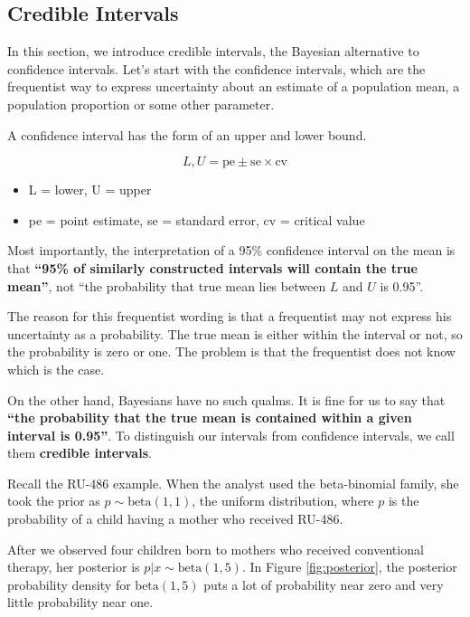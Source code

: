 \documentclass[]{book}
\providecommand{\tightlist}{%
  \setlength{\itemsep}{0pt}\setlength{\parskip}{0pt}}
\theoremstyle{definition}
\theoremstyle{definition}
\theoremstyle{definition}
\theoremstyle{remark}
\begin{document}
\subsection{Credible Intervals}\label{credible-intervals}

In this section, we introduce credible intervals, the Bayesian
alternative to confidence intervals. Let's start with the confidence
intervals, which are the frequentist way to express uncertainty about an
estimate of a population mean, a population proportion or some other
parameter.

A confidence interval has the form of an upper and lower bound.

\[L, U = \text{pe} \pm \text{se} \times \text{cv}\]

\begin{itemize}
\tightlist
\item
  L = lower, U = upper
\item
  pe = point estimate, se = standard error, cv = critical value
\end{itemize}

Most importantly, the interpretation of a 95\% confidence interval on
the mean is that \textbf{``95\% of similarly constructed intervals will
contain the true mean''}, not ``the probability that true mean lies
between \(L\) and \(U\) is 0.95''.

The reason for this frequentist wording is that a frequentist may not
express his uncertainty as a probability. The true mean is either within
the interval or not, so the probability is zero or one. The problem is
that the frequentist does not know which is the case.

On the other hand, Bayesians have no such qualms. It is fine for us to
say that \textbf{``the probability that the true mean is contained
within a given interval is 0.95''}. To distinguish our intervals from
confidence intervals, we call them \textbf{credible intervals}.

Recall the RU-486 example. When the analyst used the beta-binomial
family, she took the prior as \(p \sim \text{beta}(1,1)\), the uniform
distribution, where \(p\) is the probability of a child having a mother
who received RU-486.

After we observed four children born to mothers who received
conventional therapy, her posterior is \(p|x \sim \text{beta}(1,5)\). In
Figure \ref{fig:posterior}, the posterior probability density for
\(\text{beta}(1,5)\) puts a lot of probability near zero and very little
probability near one.
\end{document}
